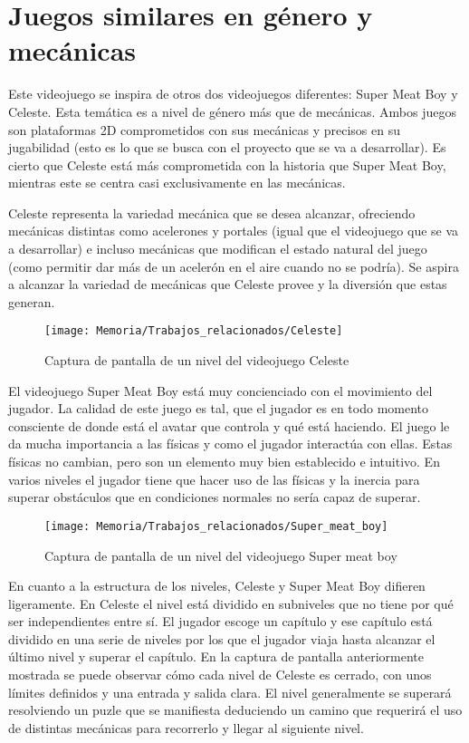 
\section{Juegos similares en género y mecánicas}
Este videojuego se inspira de otros dos videojuegos diferentes: Super Meat Boy y Celeste. Esta temática es a nivel de género más que de mecánicas. Ambos juegos son plataformas 2D comprometidos con sus mecánicas y precisos en su jugabilidad (esto es lo que se busca con el proyecto que se va a desarrollar). Es cierto que Celeste está más comprometida con la historia que Super Meat Boy, mientras este se centra casi exclusivamente en las mecánicas.

Celeste representa la variedad mecánica que se desea alcanzar, ofreciendo mecánicas distintas como acelerones y portales (igual que el videojuego que se va a desarrollar) e incluso mecánicas que modifican el estado natural del juego (como permitir dar más de un acelerón en el aire cuando no se podría). Se aspira a alcanzar la variedad de mecánicas que Celeste provee y la diversión que estas generan.

\begin{figure}[h]
\centering
\texttt{[image: Memoria/Trabajos\_relacionados/Celeste]}
\caption{Captura de pantalla de un nivel del videojuego Celeste}
\end{figure}
\clearpage

El videojuego Super Meat Boy está muy concienciado con el movimiento del jugador. La calidad de este juego es tal, que el jugador es en todo momento consciente de donde está el avatar que controla y qué está haciendo. El juego le da mucha importancia a las físicas y como el jugador interactúa con ellas. Estas físicas no cambian, pero son un elemento muy bien establecido e intuitivo. En varios niveles el jugador tiene que hacer uso de las físicas y la inercia para superar obstáculos que en condiciones normales no sería capaz de superar.

\begin{figure}[h]
\centering
\texttt{[image: Memoria/Trabajos\_relacionados/Super\_meat\_boy]}
\caption{Captura de pantalla de un nivel del videojuego Super meat boy}
\end{figure}

En cuanto a la estructura de los niveles, Celeste y Super Meat Boy difieren ligeramente. En Celeste el nivel está dividido en subniveles que no tiene por qué ser independientes entre sí. El jugador escoge un capítulo y ese capítulo está dividido en una serie de niveles por los que el jugador viaja hasta alcanzar el último nivel y superar el capítulo. En la captura de pantalla anteriormente mostrada se puede observar cómo cada nivel de Celeste es cerrado, con unos límites definidos y una entrada y salida clara. El nivel generalmente se superará resolviendo un puzle que se manifiesta deduciendo un camino que requerirá el uso de distintas mecánicas para recorrerlo y llegar al siguiente nivel.

